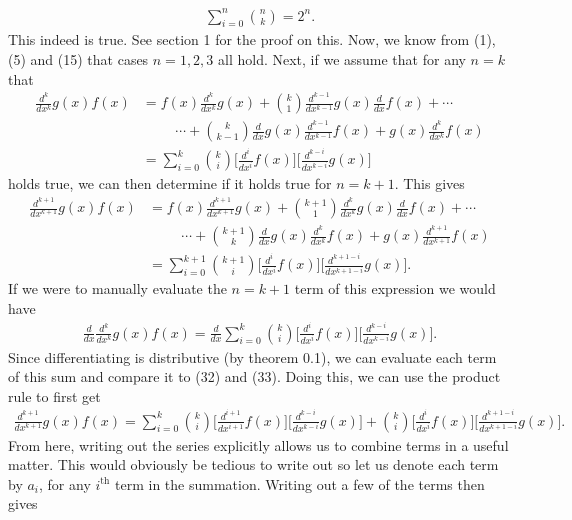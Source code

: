 \begin{align}
	\sum_{i=0}^{n}{{n}\choose{k}} = 2^n.
\end{align}
This indeed is true. See section 1 for the proof on this. Now, we know from (1), (5) and (15) that cases $n=1,2,3$ all hold. Next, if we assume that for any $n=k$ that
\begin{align}
	\frac{d^k}{dx^k}g(x)f(x)&=f(x)\frac{d^k}{dx^k}g(x)+{{k}\choose{1}}\frac{d^{k-1}}{dx^{k-1}}g(x)\frac{d}{dx}f(x)+\cdots \nonumber\\
	&\hspace{1cm}\cdots+{{k}\choose{k-1}}\frac{d}{dx}g(x)\frac{d^{k-1}}{dx^{k-1}}f(x)+g(x)\frac{d^k}{dx^k}f(x) \\
	&=\sum_{i=0}^{k}{{k}\choose{i}}\bigg[\frac{d^i}{dx^i}f(x) \bigg]\bigg[\frac{d^{k-i}}{dx^{k-i}}g(x) \bigg]
\end{align}
holds true, we can then determine if it holds true for $n=k+1$. This gives
\begin{align}
	\frac{d^{k+1}}{dx^{k+1}}g(x)f(x)&=f(x)\frac{d^{k+1}}{dx^{k+1}}g(x)+{{{k+1}}\choose{1}}\frac{d^{k}}{dx^{k}}g(x)\frac{d}{dx}f(x)+\cdots \nonumber\\
	&\hspace{1cm}\cdots+{{k+1}\choose{k}}\frac{d}{dx}g(x)\frac{d^{k}}{dx^{k}}f(x)+g(x)\frac{d^{k+1}}{dx^{k+1}}f(x) \\
	&=\sum_{i=0}^{k+1}{{k+1}\choose{i}}\bigg[\frac{d^i}{dx^i}f(x) \bigg]\bigg[\frac{d^{k+1-i}}{dx^{k+1-i}}g(x) \bigg].
\end{align}
If we were to manually evaluate the $n=k+1$ term of this expression we would have
\begin{align}
	\frac{d}{dx}\frac{d^{k}}{dx^{k}}g(x)f(x)= \frac{d}{dx}\sum_{i=0}^{k}{{k}\choose{i}}\bigg[\frac{d^i}{dx^i}f(x) \bigg]\bigg[\frac{d^{k-i}}{dx^{k-i}}g(x) \bigg].
\end{align}
Since differentiating is distributive (by theorem 0.1), we can evaluate each term of this sum and compare it to (32) and (33). Doing this, we can use the product rule to first get
\begin{align}
	\frac{d^{k+1}}{dx^{k+1}}g(x)f(x)=\sum_{i=0}^{k}{{k}\choose{i}}\bigg[\frac{d^{i+1}}{dx^{i+1}}f(x) \bigg]\bigg[\frac{d^{k-i}}{dx^{k-i}}g(x) \bigg]+{{k}\choose{i}}\bigg[\frac{d^i}{dx^i}f(x) \bigg]\bigg[\frac{d^{k+1-i}}{dx^{k+1-i}}g(x) \bigg]. 
\end{align}
From here, writing out the series explicitly allows us to combine terms in a useful matter. This would obviously be tedious to write out so let us denote each term by $a_i$, for any $i^{\textrm{th}}$ term in the summation. Writing out a few of the terms then gives
